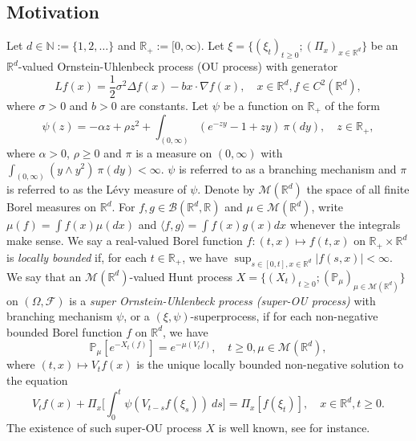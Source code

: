 \documentclass[EJP]{ejpecp} %
\begin{document}
\subsection{Motivation}
\label{subsec:M}
	Let $d \in \mathbb N:= \{1,2,\dots\}$ and $\mathbb R_+:= [0,\infty)$.
	Let $\xi=\{(\xi_t)_{t\geq 0}; (\Pi_x)_{x\in \mathbb R^d}\}$ be an $\mathbb R^d$-valued Ornstein-Uhlenbeck process (OU process) with generator
\[
	Lf(x)
	= \frac{1}{2}\sigma^2\Delta f(x)-b x \cdot \nabla f(x), 
	\quad  x\in \mathbb R^d, f \in C^2(\mathbb R^d),
\]
	where $\sigma > 0$ and $b > 0$ are constants.
	Let $\psi$ be a function on $\mathbb R_+$ of the form
\begin{equation}
\label{eq: honogeneou branching mechanism}
	\psi(z)
	=- \alpha z + \rho z^2 + \int_{(0,\infty)} (e^{-zy} - 1 + zy)~\pi(dy), 
	\quad  z \in \mathbb R_+,
\end{equation}
	where $\alpha > 0 $, $\rho \geq0$ and $\pi$ is a measure on $(0,\infty)$ with $\int_{(0,\infty)}(y\wedge y^2)~\pi(dy)< \infty$.
	$\psi$ is referred to as a branching mechanism and $\pi$ is referred to as the L\'evy measure of $\psi$.
	Denote by $\mathcal M(\mathbb R^d)$ the space of all finite Borel measures on $\mathbb R^d$.
	For $f,g\in \mathcal B(\mathbb R^d, \mathbb R)$ and $\mu \in \mathcal M(\mathbb R^d)$, write $\mu(f)= \int f(x)\mu(dx)$ and $\langle f, g\rangle = \int f(x)g(x) dx$ whenever the integrals make sense.
	We say a real-valued Borel function $f:(t,x)\mapsto f(t,x)$ on $\mathbb R_+\times \mathbb R^d$ is \emph{locally bounded} if, for each $t\in \mathbb R_+$, we have $ \sup_{s\in [0,t],x\in \mathbb R^d} |f(s,x)|<\infty.$
	We say that an $\mathcal M(\mathbb R^d)$-valued Hunt process $X = \{(X_t)_{t\geq 0}; (\mathbb{P}_{\mu})_{\mu \in \mathcal M(\mathbb R^d)}\}$ on  $(\Omega, \mathscr{F})$ is a \emph{super Ornstein-Uhlenbeck process (super-OU process)} with branching mechanism $\psi$, or a $(\xi, \psi)$-superprocess, if for each non-negative bounded Borel function $f$ on $\mathbb R^d$, we have
\begin{equation}
\label{eq: def of V_t}
	\mathbb{P}_{\mu}[e^{-X_t(f)}]
	= e^{-\mu(V_tf)}, 
	\quad t\geq 0, \mu \in \mathcal M(\mathbb R^d),
\end{equation}
	where $(t,x) \mapsto V_tf(x)$ is the unique locally bounded non-negative solution to the equation
\[
	V_tf(x) + \Pi_x \Big[ \int_0^t\psi (V_{t-s}f(\xi_s) )~ds\Big]
	= \Pi_x [f(\xi_t)], 
	\quad x\in \mathbb R^d, t\geq 0.
\]	
	The existence of such super-OU process $X$ is well known, see \cite{Dynkin1993Superprocesses} for instance.
\end{document}
